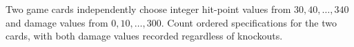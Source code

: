 Two game cards independently choose integer hit-point values from $30,40,\ldots,340$ and damage values from $0,10,\ldots,300$. Count ordered specifications for the two cards, with both damage values recorded regardless of knockouts.
